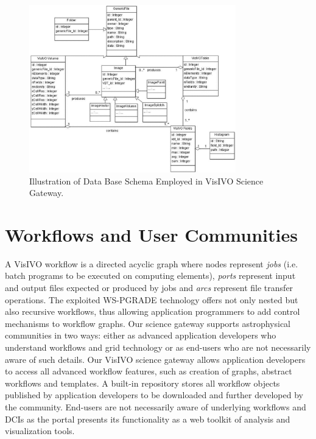 \begin{figure}
\begin{center}
\includegraphics[width=0.8\textwidth]{part5/Costa_O08/O08_f2.eps}
\caption{Illustration of Data Base Schema Employed in VisIVO Science Gateway.}
\label{fg1}
\end{center}
\end{figure}

\section{Workflows and User Communities}
A VisIVO workflow is a directed acyclic graph where nodes represent \emph{jobs} (i.e. batch programs to be executed on computing elements),  \emph{ports} represent input and output files expected or produced by jobs and \emph{arcs} represent file transfer operations. The exploited WS-PGRADE technology offers not only nested but also recursive workflows, thus allowing application programmers to add control mechanisms to workflow graphs. Our science gateway supports astrophysical communities in two ways: either as advanced application developers who understand workflows and grid technology or as end-users who are not necessarily aware of such details. Our VisIVO science gateway allows application developers to access all advanced workflow features, such as creation of graphs, abstract workflows and templates. A built-in repository stores all workflow objects published by application developers to be downloaded and further developed by the community. End-users are not necessarily aware of underlying workflows and DCIs as the portal presents its functionality as a web toolkit of analysis and visualization tools. 

